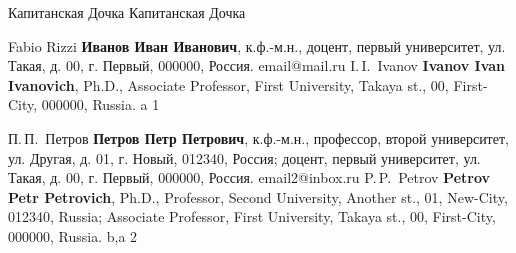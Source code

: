 



\usepackage{graphicx}



\Title%
	{Капитанская Дочка} %
	{Капитанская Дочка} %


%


\Author%
{Fabio Rizzi} %
{\textbf{Иванов Иван Иванович}, к.ф.-м.н., доцент,  первый университет, ул. Такая, д. 00, г. Первый, 000000, Россия.}
{email@mail.ru} %
{I.\,I.~Ivanov}%
{\textbf{Ivanov Ivan Ivanovich}, Ph.D., Associate Professor, First University, Takaya st., 00, First-City, 000000, Russia.}
{a} %
{1} %

\Author%
{П.\,П.~Петров}%
{\textbf{Петров Петр Петрович}, к.ф.-м.н., профессор,  второй университет, ул. Другая, д. 01, г. Новый, 012340, Россия; доцент, первый университет, ул. Такая, д. 00, г. Первый, 000000, Россия.}
{email2@inbox.ru} %
{P.\,P.~Petrov} %
{\textbf{Petrov Petr Petrovich}, Ph.D., Professor, Second University, Another st., 01, New-City, 012340, Russia; Associate Professor, First University, Takaya st., 00, First-City, 000000, Russia.}
{b,a} %
{2} %

